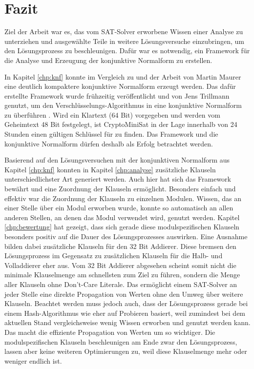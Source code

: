 \chapter{Fazit}
\label{chp:fazit}

Ziel der Arbeit war es, das vom SAT-Solver erworbene Wissen einer Analyse zu unterziehen und ausgewählte Teile in weitere Lösungsversuche
einzubringen, um den Lösungsprozess zu beschleunigen. Dafür war es notwendig, ein Framework für die Analyse und Erzeugung der konjunktive Normalform zu erstellen.

In Kapitel \ref{chp:knf} konnte im Vergleich zu  und der Arbeit von Martin Maurer eine deutlich kompaktere konjunktive Normalform erzeugt werden.
Das dafür erstellte Framework wurde frühzeitig veröffentlicht und von Jens Trillmann genutzt, um den Verschlüsselungs-Algorithmus  in eine
konjunktive Normalform zu überführen \cite{trillmann}. Wird ein Klartext (64 Bit) vorgegeben und werden vom Geheimtext 48 Bit festgelegt, ist CryptoMiniSat
in der Lage innerhalb von 24 Stunden einen gültigen Schlüssel für  zu finden. Das Framework und die konjunktive Normalform dürfen deshalb als
Erfolg betrachtet werden.

Basierend auf den Lösungsversuchen mit der konjunktiven Normalform aus Kapitel \ref{chp:knf} konnten in Kapitel \ref{chp:analyse} zusätzliche Klauseln
unterschiedlichster Art generiert werden. Auch hier hat sich das Framework bewährt und eine Zuordnung der Klauseln ermöglicht. Besonders einfach und
effektiv war die Zuordnung der Klauseln zu einzelnen Modulen. Wissen, das an einer Stelle über ein Modul erworben wurde, konnte so automatisch an allen
anderen Stellen, an denen das Modul verwendet wird, genutzt werden. Kapitel \ref{chp:bewertung} hat gezeigt, dass sich gerade diese modulspezifischen
Klauseln besonders positiv auf die Dauer des Lösungsprozesses auswirken. Eine Ausnahme bilden dabei zusätzliche Klauseln für den 32 Bit Addierer. Diese
bremsen den Lösungsprozess im Gegensatz zu zusätzlichen Klauseln für die Halb- und Volladdierer eher aus. Vom 32 Bit Addierer abgesehen scheint somit
nicht die minimale Klauselmenge am schnellsten zum Ziel zu führen, sondern die Menge aller Klauseln ohne Don't-Care Literale. Das ermöglicht einem
SAT-Solver an jeder Stelle eine direkte Propagation von Werten ohne den Umweg über weitere Klauseln. Beachtet werden muss jedoch auch, dass der
Lösungsprozess gerade bei einem Hash-Algorithmus wie  eher auf Probieren basiert, weil zumindest bei dem aktuellen Stand vergleichsweise
wenig Wissen erworben und genutzt werden kann. Das macht die effiziente Propagation von Werten um so wichtiger. Die modulspezifischen Klauseln
beschleunigen am Ende zwar den Lösungsprozess, lassen aber keine weiteren Optimierungen zu, weil diese Klauselmenge mehr oder weniger endlich ist.

